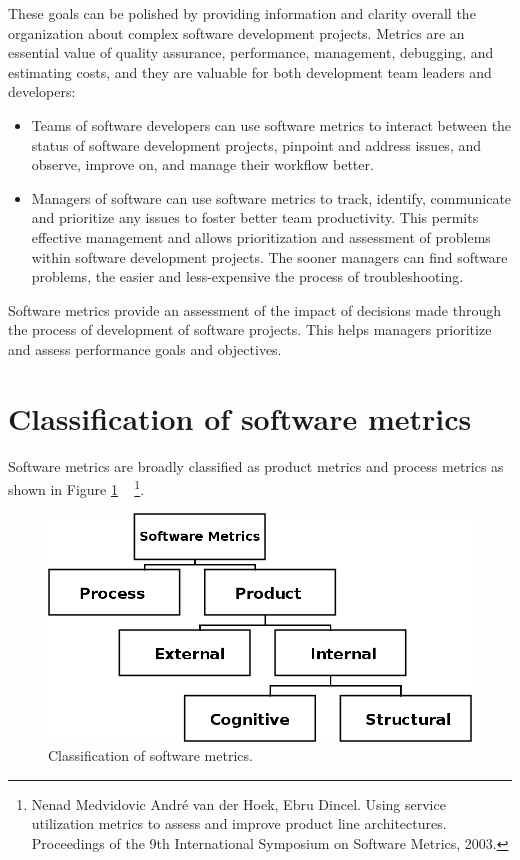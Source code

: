 These goals can be polished by providing information and clarity overall the organization about complex software development projects. Metrics are an essential value of quality assurance, performance, management, debugging, and estimating costs, and they are valuable for both development team leaders and developers:

\begin{itemize}
	\item Teams of software developers can use software metrics to interact between the status of
	software development projects, pinpoint and address issues, and observe, improve on,
	and manage their workflow better.
	\item Managers of software can use software metrics to track, identify, communicate and prioritize any
	issues to foster better team productivity. This permits effective management and allows
	prioritization and assessment of problems within software development projects. The
	sooner managers can find software problems, the easier and less-expensive the process of troubleshooting.
\end{itemize}

Software metrics provide an assessment of the impact of decisions made through the process of development of software projects. This helps managers prioritize and assess performance goals and objectives.

\section{Classification of software metrics}

Software metrics are broadly classified as product metrics and process metrics as shown in Figure \ref{fig:classification} ~\cite{metrics2} \footnote{Nenad Medvidovic André van der Hoek, Ebru Dincel. Using service utilization metrics to assess and improve product line architectures. Proceedings of the 9th International Symposium on Software Metrics, 2003.}.
\begin{figure}[ht]
	\centering
	\includegraphics[width=\textwidth]{figures/classification.png}
	\caption{Classification of software metrics.}
	\label{fig:classification}
\end{figure}

